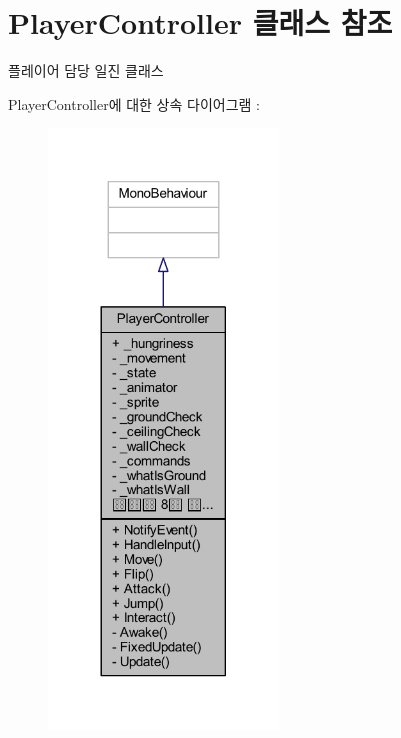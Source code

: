 \hypertarget{class_player_controller}{}\section{Player\+Controller 클래스 참조}
\label{class_player_controller}


플레이어 담당 일진 클래스  




Player\+Controller에 대한 상속 다이어그램 \+: \nopagebreak
\begin{figure}[H]
\begin{center}
\leavevmode
\includegraphics[width=173pt]{d1/dc2/class_player_controller__inherit__graph}
\end{center}
\end{figure}


